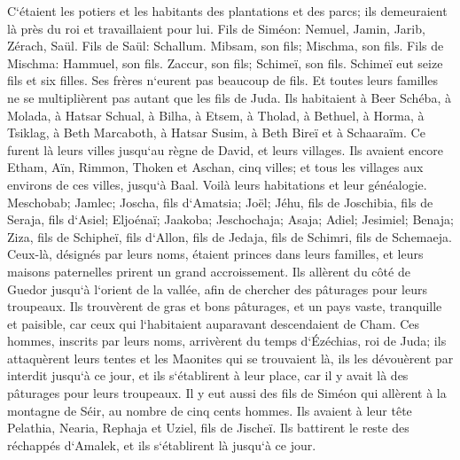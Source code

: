\verse C`étaient les potiers et les habitants des plantations et des parcs; ils demeuraient là près du roi et travaillaient pour lui. 
\verse Fils de Siméon: Nemuel, Jamin, Jarib, Zérach, Saül. 
\verse Fils de Saül: Schallum. Mibsam, son fils; Mischma, son fils. 
\verse Fils de Mischma: Hammuel, son fils. Zaccur, son fils; Schimeï, son fils. 
\verse Schimeï eut seize fils et six filles. Ses frères n`eurent pas beaucoup de fils. Et toutes leurs familles ne se multiplièrent pas autant que les fils de Juda. 
\verse Ils habitaient à Beer Schéba, à Molada, à Hatsar Schual, 
\verse à Bilha, à Etsem, à Tholad, 
\verse à Bethuel, à Horma, à Tsiklag, 
\verse à Beth Marcaboth, à Hatsar Susim, à Beth Bireï et à Schaaraïm. Ce furent là leurs villes jusqu`au règne de David, et leurs villages. 
\verse Ils avaient encore Etham, Aïn, Rimmon, Thoken et Aschan, cinq villes; 
\verse et tous les villages aux environs de ces villes, jusqu`à Baal. Voilà leurs habitations et leur généalogie. 
\verse Meschobab; Jamlec; Joscha, fils d`Amatsia; 
\verse Joël; Jéhu, fils de Joschibia, fils de Seraja, fils d`Asiel; 
\verse Eljoénaï; Jaakoba; Jeschochaja; Asaja; Adiel; Jesimiel; Benaja; 
\verse Ziza, fils de Schipheï, fils d`Allon, fils de Jedaja, fils de Schimri, fils de Schemaeja. 
\verse Ceux-là, désignés par leurs noms, étaient princes dans leurs familles, et leurs maisons paternelles prirent un grand accroissement. 
\verse Ils allèrent du côté de Guedor jusqu`à l`orient de la vallée, afin de chercher des pâturages pour leurs troupeaux. 
\verse Ils trouvèrent de gras et bons pâturages, et un pays vaste, tranquille et paisible, car ceux qui l`habitaient auparavant descendaient de Cham. 
\verse Ces hommes, inscrits par leurs noms, arrivèrent du temps d`Ézéchias, roi de Juda; ils attaquèrent leurs tentes et les Maonites qui se trouvaient là, ils les dévouèrent par interdit jusqu`à ce jour, et ils s`établirent à leur place, car il y avait là des pâturages pour leurs troupeaux. 
\verse Il y eut aussi des fils de Siméon qui allèrent à la montagne de Séir, au nombre de cinq cents hommes. Ils avaient à leur tête Pelathia, Nearia, Rephaja et Uziel, fils de Jischeï. 
\verse Ils battirent le reste des réchappés d`Amalek, et ils s`établirent là jusqu`à ce jour. 

